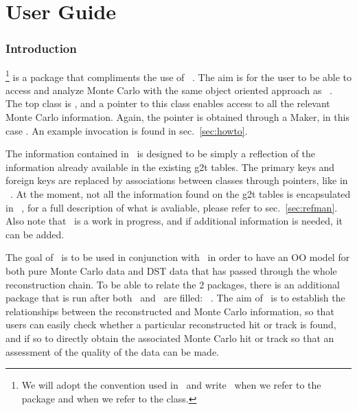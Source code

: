 \part{User Guide}
\clearpage


\section{Introduction}

\StMcEvent\footnote{We will adopt the convention used in \StEvent\ 
    and write \StMcEvent\ when we refer to the package and
     when we refer to the class.} is a package that
compliments the use of \StEvent\ . The aim is for the user to be able
to access and analyze Monte Carlo with the same object oriented
approach as \StEvent\ . The top class is , and a
pointer to this  class enables access to all the relevant Monte Carlo
information.  Again, the pointer is obtained through a Maker, in this
case \name{StMcEventMaker}.  An example invocation is found in sec.~\ref{sec:howto}.

The information contained in \StMcEvent\ is designed to be simply
a reflection of the information already available in the existing
g2t tables.  The primary keys and foreign keys are replaced by
associations between classes through pointers, like in \StEvent\ .
At the moment, not all the information found on the g2t tables is
encapsulated in \StMcEvent\ , for a full description of what is
avaliable, please refer to sec.~\ref{sec:refman}.  Also note that
\StMcEvent\ is a work in progress, and if additional information
is needed, it can be added.

The goal of \StMcEvent\ is to be used in conjunction with \StEvent\ in
order to have an OO model for both pure Monte Carlo data and DST data
that has passed through the whole reconstruction chain.  To be able
to relate the 2 packages, there is an additional package that is
run after both \StEvent\ and \StMcEvent\ are filled: \StAssociationMaker\ .
\index{StAssociationMaker}
The aim of \StAssociationMaker\ is to establish the relationships
between the reconstructed and Monte Carlo information, so that
users can easily check whether a particular reconstructed hit or
track is found, and if so to directly obtain the associated Monte
Carlo hit or track so that an assessment of the quality of the
data can be made.

\clearpage


